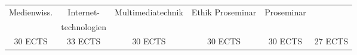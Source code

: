 \begin{table}[htbp]
{\begin{tabular}{|cccccc|}
\multicolumn{1}{|c|}{Medienwiss.}  & \multicolumn{1}{c|}{Internet-}     & \multicolumn{1}{c|}{Multimediatechnik} & \multicolumn{1}{c|}{Ethik Proseminar} & \multicolumn{1}{c|}{Proseminar}        &                 \\ \cline{1-1} \cline{3-5}
\multicolumn{1}{|c|}{}             & \multicolumn{1}{c|}{technologien}  & \multicolumn{1}{c|}{}                  & \multicolumn{1}{c|}{}                 & \multicolumn{1}{c|}{}                  &                 \\ \hline
30 ECTS                            & 33 ECTS                            & 30 ECTS                                & 30 ECTS                               & 30 ECTS                                & 27 ECTS         \\ \hline
\end{tabular}}
\end{table}
